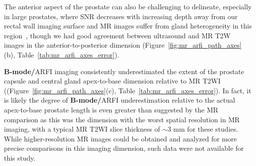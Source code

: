 The anterior aspect of the prostate can also be challenging to delineate,
especially in large prostates, where SNR decreases with increasing depth away
from our rectal wall imaging surface and MR images suffer from gland
heterogeneity in this region~\cite{Gupta2013}, though we had good agreement
between ultrasound and MR T2W images in the anterior-to-posterior dimension
(Figure~\ref{fig:mr_arfi_path_axes}(b), Table~\ref{tab:mr_arfi_axes_error}).

\textbf{B-mode/}ARFI imaging consistently underestimated the extent of the
prostate capsule and central gland apex-to-base dimension relative to MR T2WI
((Figure~\ref{fig:mr_arfi_path_axes}(c), Table~\ref{tab:mr_arfi_axes_error}).
In fact, it is likely the degree of \textbf{B-mode/}ARFI underestimation
relative to the actual apex-to-base prostate length is even greater than
suggested by the MR comparison as this was the dimension with the worst spatial
resolution in MR imaging, with a typical MR T2WI slice thickness of $\sim$3 mm
for these studies.  While higher-resolution MR images could be obtained and
analyzed for more precise comparisons in this imaging dimension, such data were
not available for this study. 
